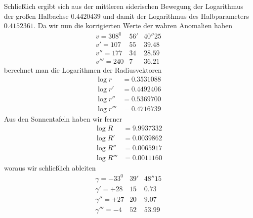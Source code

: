Schließlich ergibt sich aus der mittleren siderischen Bewegung der Logarithmus der großen Halbachse $0.4420439$ und damit der Logarithmus des Halbparameters $0.4152361$. Da wir nun die korrigierten Werte der wahren Anomalien haben
\SourceGathering{2\textsuperscript{*}}
\[
\begin{array}{rrr}
v=308^0&56'&40''25\\
v'=107&55&39.48\\
v''=177&34&28.59\\
v'''=240&7&36.21
\end{array}
\]
berechnet man die Logarithmen der Radiusvektoren
\[
\begin{aligned}
\log r&=0.3531088\\
\log r'&=0.4492406\\
\log r''&=0.5369700\\
\log r'''&=0.4716739
\end{aligned}
\]
Aus den Sonnentafeln haben wir ferner
\[
\begin{aligned}
\log R&=9.9937332\\
\log R'&=0.0039862\\
\log R''&=0.0065917\\
\log R'''&=0.0011160
\end{aligned}
\]
woraus wir schließlich ableiten
\[
\begin{array}{rrr}
\gamma=-33^0&39'&48''15\\
\gamma'=+28&15&0.73\\
\gamma''=+27&20&9.07\\
\gamma'''=-4&52&53.99
\end{array}
\]

